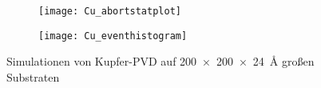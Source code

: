 \begin{figure}

  \captionsetup[subfigure]{justification=centering,singlelinecheck=false}
  \def\subfigwidth{7cm}

  \begin{subfigure}[t]{\subfigwidth}
    \texttt{[image: Cu\_abortstatplot]}
    \label{fig:copperworkerdensity-a}
  \end{subfigure}
  \hfill
  \begin{subfigure}[t]{\subfigwidth}
    \texttt{[image: Cu\_eventhistogram]}
    \label{fig:copperworkerdensity-b}
  \end{subfigure}
  \caption{Simulationen von Kupfer-PVD auf \SI{200x200x24}{\angstrom} großen Substraten}
  \label{fig:copperworkerdensity}
\end{figure}
